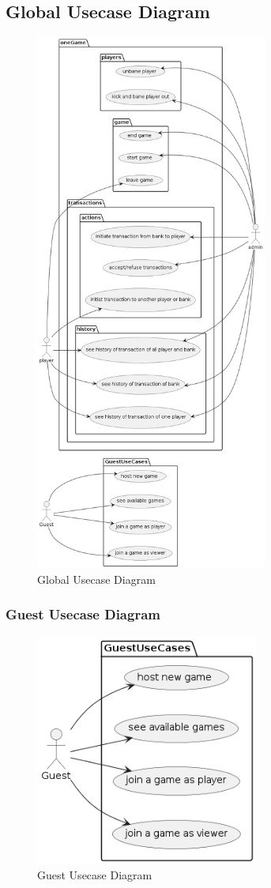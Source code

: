 \documentclass{article}
\begin{document}
\subsection{Global Usecase Diagram}
\begin{figure}[H]
	\centering
	\includegraphics[height=7in]{../thesis_tex/assets/diagrams/global_ucd.png}
	\caption{Global Usecase Diagram}
\end{figure}
\cleardoublepage

\subsubsection{Guest Usecase Diagram}
\begin{figure}[H]
	\centering
	\includegraphics[height=3in]{../thesis_tex/assets/diagrams/guest_ucd.png}
	\caption{Guest Usecase Diagram}
\end{figure}
\end{document}
